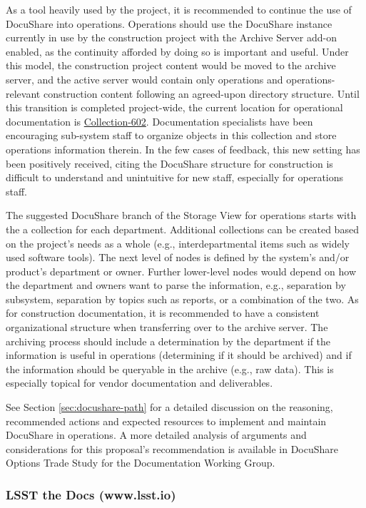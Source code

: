As a tool heavily used by the project, it is recommended to continue the use of DocuShare into operations.
Operations should use the DocuShare instance currently in use by the construction project with the Archive Server add-on enabled, as the continuity afforded by doing so is important and useful.
Under this model, the construction project content would be moved to the archive server, and the active server would contain only operations and operations-relevant construction content following an agreed-upon directory structure.
Until this transition is completed project-wide, the current location for operational documentation is \href{https://docushare.lsstcorp.org/docushare/dsweb/View/Collection-602}{Collection-602}.
Documentation specialists have been encouraging sub-system staff to organize objects in this collection and store operations information therein.
In the few cases of feedback, this new setting has been positively received, citing the DocuShare structure for construction is difficult to understand and unintuitive for new staff, especially for operations staff.

The suggested DocuShare branch of the Storage View for operations starts with the a collection for each department.
Additional collections can be created based on the project's needs as a whole (e.g., interdepartmental items such as widely used software tools).
The next level of nodes is defined by the system's and/or product's department or owner.
Further lower-level nodes would depend on how the department and owners want to parse the information, e.g., separation by subsystem, separation by topics such as reports, or a combination of the two.
As for construction documentation, it is recommended to have a consistent organizational structure when transferring over to the archive server.
The archiving process should include a determination by the department if the information is useful in operations (determining if it should be archived) and if the information should be queryable in the archive (e.g., raw data).
This is especially topical for vendor documentation and deliverables.

See Section \ref{sec:docushare-path} for a detailed discussion on the reasoning, recommended actions and expected resources to implement and maintain DocuShare in operations.
A more detailed analysis of arguments and considerations for this proposal's recommendation is available in DocuShare Options Trade Study for the Documentation Working Group. 

\subsubsection{LSST the Docs (www.lsst.io)}

